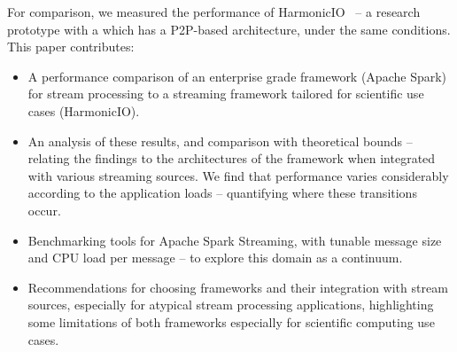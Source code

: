\documentclass[conference]{IEEEtran}
\begin{document}
For comparison, we measured the performance of HarmonicIO~\cite{torruangwatthanaHarmonicIOScalableData2018} -- a research prototype with a which has a P2P-based architecture, under the same conditions. 
This paper contributes:

\begin{itemize}
\item A performance comparison of an enterprise grade framework (Apache Spark) for stream processing to a streaming framework tailored for scientific use cases (HarmonicIO).

\item An analysis of these results, and comparison with theoretical bounds -- relating the findings to the architectures of the framework when integrated with various streaming sources. We find that performance varies considerably according to the application loads -- quantifying where these transitions occur.

\item Benchmarking tools for Apache Spark Streaming, %
with tunable message size and CPU load per message -- to explore this domain as a continuum.

\item Recommendations for choosing frameworks and their integration with stream sources, especially for atypical stream processing applications, highlighting some 
 limitations of both frameworks especially for scientific computing use cases.  %
 
\end{itemize}


\end{document}
